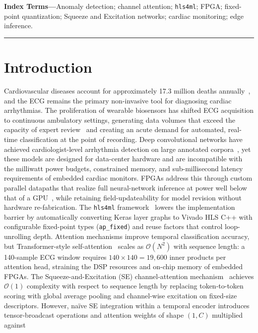 \documentclass[12pt, letterpaper]{article}
\newcommand{\keywords}[1]{%
  \vspace{0.4em}%
  
\noindent\textbf{Index Terms---}#1%
  \vspace{0.6em}%
}
\begin{document}
\keywords{Anomaly detection; channel attention; \texttt{hls4ml}; FPGA; fixed-point quantization; Squeeze and Excitation networks;  cardiac monitoring; edge inference.}

\vspace{1em}
\hrule


\section{Introduction}
\label{sec:intro}
Cardiovascular diseases account for approximately 17.3 million deaths
annually~\cite{Roth2020}, and the ECG remains the primary non-invasive
tool for diagnosing cardiac arrhythmias.
The proliferation of wearable
biosensors has shifted ECG acquisition to continuous ambulatory settings,
generating data volumes that exceed the capacity of expert
review~\cite{Hannun2019} and creating an acute demand for automated,
real-time classification at the point of recording.
Deep convolutional networks have achieved cardiologist-level arrhythmia
detection on large annotated corpora~\cite{Rajpurkar2017, Hannun2019},
yet these models are designed for data-center hardware and are
incompatible with the milliwatt power budgets, constrained memory, and
sub-millisecond latency requirements of embedded cardiac monitors.
FPGAs
address this through custom parallel datapaths that realize full
neural-network inference at power well below that of a
GPU~\cite{Guo2019}, while retaining field-updateability for model
revision without hardware re-fabrication.
The \texttt{hls4ml}
framework~\cite{Duarte2018, Fahim2021} lowers the implementation barrier
by automatically converting Keras layer graphs to Vivado HLS C++ with
configurable fixed-point types (\texttt{ap\_fixed}) and reuse factors
that control loop-unrolling depth.
Attention mechanisms improve temporal classification accuracy, but
Transformer-style self-attention~\cite{Vaswani2017} scales as
$\mathcal{O}(N^2)$ with sequence length: a 140-sample ECG window requires
$140 \times 140 = 19{,}600$ inner products per attention head, straining
the DSP resources and on-chip memory of embedded FPGAs.
The
Squeeze-and-Excitation (SE) channel-attention mechanism~\cite{Hu2018}
achieves $\mathcal{O}(1)$ complexity with respect to sequence length by
replacing token-to-token scoring with global average pooling and
channel-wise excitation on fixed-size descriptors.
However, naïve SE
integration within a temporal encoder introduces tensor-broadcast operations and attention weights of shape $(1,C)$ multiplied against
\end{document}
